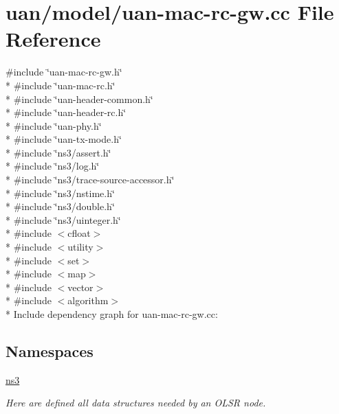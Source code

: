 \hypertarget{uan-mac-rc-gw_8cc}{}\section{uan/model/uan-\/mac-\/rc-\/gw.cc File Reference}
\label{uan-mac-rc-gw_8cc}
{\ttfamily \#include \char`\"{}uan-\/mac-\/rc-\/gw.\+h\char`\"{}}\\*
{\ttfamily \#include \char`\"{}uan-\/mac-\/rc.\+h\char`\"{}}\\*
{\ttfamily \#include \char`\"{}uan-\/header-\/common.\+h\char`\"{}}\\*
{\ttfamily \#include \char`\"{}uan-\/header-\/rc.\+h\char`\"{}}\\*
{\ttfamily \#include \char`\"{}uan-\/phy.\+h\char`\"{}}\\*
{\ttfamily \#include \char`\"{}uan-\/tx-\/mode.\+h\char`\"{}}\\*
{\ttfamily \#include \char`\"{}ns3/assert.\+h\char`\"{}}\\*
{\ttfamily \#include \char`\"{}ns3/log.\+h\char`\"{}}\\*
{\ttfamily \#include \char`\"{}ns3/trace-\/source-\/accessor.\+h\char`\"{}}\\*
{\ttfamily \#include \char`\"{}ns3/nstime.\+h\char`\"{}}\\*
{\ttfamily \#include \char`\"{}ns3/double.\+h\char`\"{}}\\*
{\ttfamily \#include \char`\"{}ns3/uinteger.\+h\char`\"{}}\\*
{\ttfamily \#include $<$cfloat$>$}\\*
{\ttfamily \#include $<$utility$>$}\\*
{\ttfamily \#include $<$set$>$}\\*
{\ttfamily \#include $<$map$>$}\\*
{\ttfamily \#include $<$vector$>$}\\*
{\ttfamily \#include $<$algorithm$>$}\\*
Include dependency graph for uan-\/mac-\/rc-\/gw.cc\+:
\subsection*{Namespaces}
\begin{DoxyCompactItemize}
\item 
 \hyperlink{namespacens3}{ns3}
\begin{DoxyCompactList}\small\item\em Here are defined all data structures needed by an O\+L\+SR node. \end{DoxyCompactList}\end{DoxyCompactItemize}
